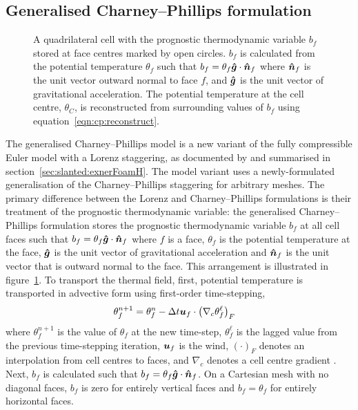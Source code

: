 \subsection{Generalised Charney--Phillips formulation}

\begin{figure}
	\centering
	
	\caption{A quadrilateral cell with the prognostic thermodynamic variable $b_f$ stored at face centres marked by open circles.
	$b_f$ is calculated from the potential temperature $\theta_f$ such that $b_f = \theta_f \bm{\hat{g}} \cdot \bm{\hat{n}}_f$ where $\bm{\hat{n}}_f$ is the unit vector outward normal to face $f$, and $\bm{\hat{g}}$ is the unit vector of gravitational acceleration.
	The potential temperature at the cell centre, $\theta_C$, is reconstructed from surrounding values of $b_f$ using equation~\eqref{eqn:cp:reconstruct}.}
	\label{fig:cp:staggering}
\end{figure}

The generalised Charney--Phillips model is a new variant of the fully compressible Euler model with a Lorenz staggering, as documented by \citet{weller-shahrokhi2014} and summarised in section~\ref{sec:slanted:exnerFoamH}.
The model variant uses a newly-formulated generalisation of the Charney--Phillips staggering for arbitrary meshes.
The primary difference between the Lorenz and Charney--Phillips formulations is their treatment of the prognostic thermodynamic variable: the generalised Charney--Phillips formulation stores the prognostic thermodynamic variable $b_f$ at all cell faces such that $b_f = \theta_f \bm{\hat{g}} \cdot \bm{\hat{n}}_f$ where $f$ is a face, $\theta_f$ is the potential temperature at the face, $\bm{\hat{g}}$ is the unit vector of gravitational acceleration and $\bm{\hat{n}}_f$ is the unit vector that is outward normal to the face.
This arrangement is illustrated in figure~\ref{fig:cp:staggering}.
To transport the thermal field, first, potential temperature is transported in advective form using first-order time-stepping,
\begin{align}
	\theta_f^{n+1} &= \theta_f^n - \Delta t \bm{u}_f \cdot \left( \nabla_c \theta_f^{\ell} \right)_F \label{eqn:cp:advection}
\end{align}
where $\theta_f^{n+1}$ is the value of $\theta_f$ at the new time-step, $\theta_f^\ell$ is the lagged value from the previous time-stepping iteration, $\bm{u}_f$ is the wind, $\left( \cdot \right)_F$ denotes an interpolation from cell centres to faces, and $\nabla_c$ denotes a cell centre gradient \citep{weller-shahrokhi2014}.
Next, $b_f$ is calculated such that $b_f = \theta_f \bm{\hat{g}} \cdot \bm{\hat{n}}_f$.  
On a Cartesian mesh with no diagonal faces, $b_f$ is zero for entirely vertical faces and $b_f = \theta_f$ for entirely horizontal faces.

